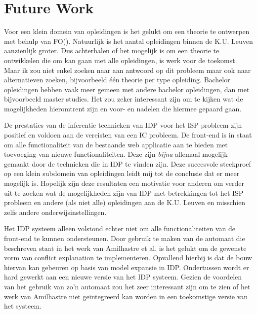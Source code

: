 \chapter{Future Work}
\label{cha:futurework}
Voor een klein domein van opleidingen is het gelukt om een theorie te ontwerpen met behulp van FO(\textperiodcentered). Natuurlijk is het aantal opleidingen binnen de K.U. Leuven aanzienlijk groter. Dus achterhalen of het mogelijk is om een theorie te ontwikkelen die om kan gaan met alle opleidingen, is werk voor de toekomst. Maar ik zou niet enkel zoeken naar aan antwoord op dit probleem maar ook naar alternatieven zoeken, bijvoorbeeld \'{e}\'{e}n theorie per type opleiding. Bachelor opleidingen hebben vaak meer gemeen met andere bachelor opleidingen, dan met bijvoorbeeld master studies. Het zou zeker interessant zijn om te kijken wat de mogelijkheden hieromtrent zijn en voor- en nadelen die hiermee gepaard gaan. 

De prestaties van de inferentie technieken van IDP voor het ISP probleem zijn positief en voldoen aan de vereisten van een IC probleem. De front-end is in staat om alle functionaliteit van de bestaande web applicatie aan te bieden met toevoeging van nieuwe functionaliteiten. Deze zijn \textit{bijna} allemaal mogelijk gemaakt door de technieken die in IDP te vinden zijn. Deze succesvole steekproef op een klein subdomein van opleidingen leidt mij tot de conclusie dat er meer mogelijk is. Hopelijk zijn deze resultaten een motivatie voor anderen om verder uit te zoeken wat de mogelijkheden zijn van IDP met betrekkingen tot het ISP probleem en andere (als niet alle) opleidingen aan de K.U. Leuven en misschien zelfs andere onderwijsinstellingen. 

Het IDP systeem alleen volstond echter niet om alle functionaliteiten van de front-end te kunnen ondersteunen. Door gebruik te maken van de automaat die beschreven staat in het werk van Amilhastre et al. is het gelukt om de gewenste vorm van conflict explanation te implementeren. Opvallend hierbij is dat de bouw hiervan kan gebeuren op basis van model expansie in IDP. Ondertussen wordt er hard gewerkt aan een nieuwe versie van het IDP systeem. Gezien de voordelen van het gebruik van zo'n automaat zou het zeer interessant zijn om te zien of het werk van Amilhastre niet ge\"{i}ntegreerd kan worden in een toekomstige versie van het systeem. 